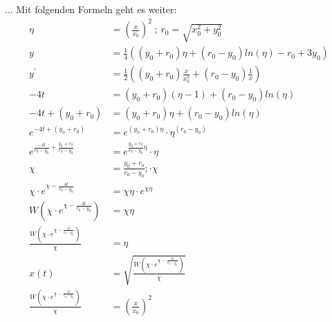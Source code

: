 ... Mit folgenden Formeln geht es weiter:
\begin{align*}
	\eta
	&=
	\left(\frac{x}{x_0}\right)^2 
	\:;\:
	r_0
	=
	\sqrt{x_0^2+y_0^2} \\
	y
	&=
	\frac{1}{4}\left(\left(y_0+r_0\right)\eta+\left(r_0-y_0\right)ln\left(\eta\right)-r_0+3y_0\right) \\
	y^\prime
	&=
	\frac{1}{2}\left(\left(y_0+r_0\right)\frac{x}{x_0^2}+\left(r_0-y_0\right)\frac{1}{x}\right) \\
	-4t
	&=
	\left(y_0+r_0\right)\left(\eta-1\right)+\left(r_0-y_0\right)ln\left(\eta\right) \\
	-4t+\left(y_0+r_0\right)
	&=
	\left(y_0+r_0\right)\eta+\left(r_0-y_0\right)ln\left(\eta\right) \\
	e^{-4t+\left(y_0+r_0\right)}
	&=
	e^{\left(y_0+r_0\right)\eta}\cdot\eta^{\left(r_0-y_0\right)} \\
	e^{\frac{-4t}{r_0-y_0}+\frac{y_0+r_0}{r_0-y_0}}
	&=
	e^{\frac{y_0+r_0}{r_0-y_0}\eta}\cdot\eta\  \\
	\chi
	&=
	\frac{y_0+r_0}{r_0-y_0}; \cdot\chi \\
	\chi\cdot e^{\chi-\frac{4t}{r_0-y_0}}
	&=
	\chi\eta\cdot e^{\chi\eta} \\
	W\left(\chi\cdot e^{\chi-\frac{4t}{r_0-y_0}}\right)
	&=
	\chi\eta \\
	\frac{W\left(\chi\cdot e^{\chi-\frac{4t}{r_0-y_0}}\right)}{\chi}
	&=
	\eta \\
	x\left(t\right)
	&=
	\sqrt{\frac{W\left(\chi\cdot e^{\chi-\frac{4t}{r_0-y_0}}\right)}{\chi}} \\
	\frac{W\left(\chi\cdot e^{\chi-\frac{4t}{r_0-y_0}}\right)}{\chi}
	&=
	\left(\frac{x}{x_0}\right)^2
\end{align*}
